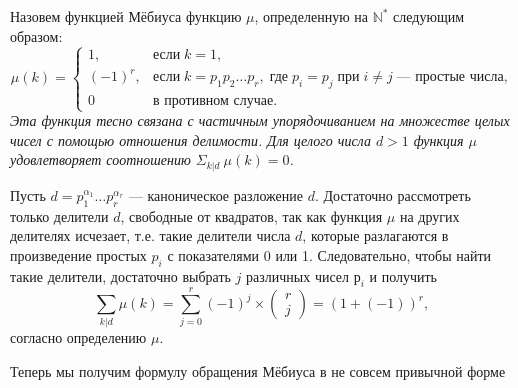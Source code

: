 \begin{property}
\hspace*{0.5cm}Назовем функцией Мёбиуса функцию $\mu$, определенную на $\mathbb{N}^{*}$ следу­ющим образом:
$$\mu(k)=
\left\lbrace
\begin{array}{ll}
1,&\text{если}\;k=1,\\
(-1)^r,&\text{если}\;k=p_{1}p_{2}\ldots p_{r},\;\text{где}\;p_{i}=p_{j}\;\text{при}\;i\neq j\;\text{— простые числа,}\\
0&\text{в противном случае.}
\end{array}
\right.$$
\textit{Эта функция тесно связана с частичным упорядочиванием на множе­стве целых чисел с помощью отношения делимости. Для целого числа
$d>1$ функция $\mu$ удовлетворяет соотношению $\Sigma_{k|d}\:\mu(k)=0$.}
\end{property}
\begin{myproof}
Пусть $d=p_{1}^{\alpha_{1}}\ldots p_{r}^{\alpha_{r}}$
 — каноническое разложение $d$. Достаточно
рассмотреть только делители $d$, свободные от квадратов, так как
функция $\mu$ на других делителях исчезает, т.е. такие делители числа
$d$, которые разлагаются в произведение простых $p_{i}$ с показателями
0 или 1. Следовательно, чтобы найти такие делители, достаточно
выбрать $j$ различных чисел $р_{i}$ и получить
$$\sum\limits_{k|d}\mu(k)=\sum\limits_{j=0}^r(-1)^j\times
\begin{pmatrix}
r\\
j
\end{pmatrix}
=(1+(-1))^r,$$
согласно определению $\mu$.
\end{myproof}

Теперь мы получим формулу обращения Мёбиуса в не совсем при­вычной форме

